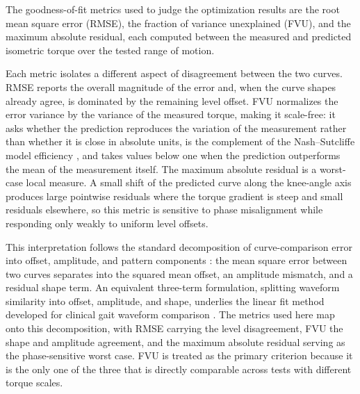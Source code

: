 The goodness-of-fit metrics used to judge the optimization results are the root mean square error (RMSE), the fraction of variance unexplained (FVU), and the maximum absolute residual, each computed between the measured and predicted isometric torque over the tested range of motion.

Each metric isolates a different aspect of disagreement between the two curves. RMSE reports the overall magnitude of the error and, when the curve shapes already agree, is dominated by the remaining level offset. FVU normalizes the error variance by the variance of the measured torque, making it scale-free: it asks whether the prediction reproduces the variation of the measurement rather than whether it is close in absolute units, is the complement of the Nash--Sutcliffe model efficiency \citep{nash_river_1970}, and takes values below one when the prediction outperforms the mean of the measurement itself. The maximum absolute residual is a worst-case local measure. A small shift of the predicted curve along the knee-angle axis produces large pointwise residuals where the torque gradient is steep and small residuals elsewhere, so this metric is sensitive to phase misalignment while responding only weakly to uniform level offsets.

This interpretation follows the standard decomposition of curve-comparison error into offset, amplitude, and pattern components \citep{taylor_summarizing_2001}: the mean square error between two curves separates into the squared mean offset, an amplitude mismatch, and a residual shape term. An equivalent three-term formulation, splitting waveform similarity into offset, amplitude, and shape, underlies the linear fit method developed for clinical gait waveform comparison \citep{iosa_assessment_2014}. The metrics used here map onto this decomposition, with RMSE carrying the level disagreement, FVU the shape and amplitude agreement, and the maximum absolute residual serving as the phase-sensitive worst case. FVU is treated as the primary criterion because it is the only one of the three that is directly comparable across tests with different torque scales.

